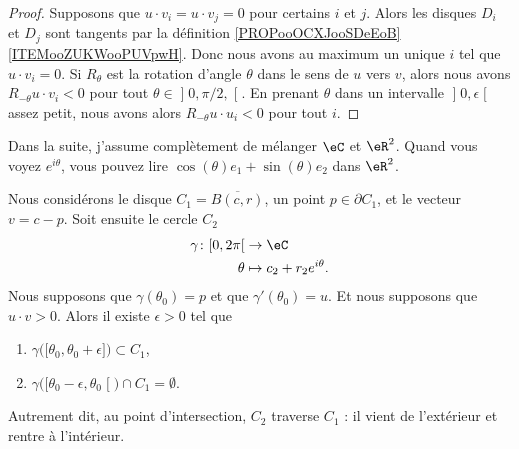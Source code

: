 \begin{proof}
	Supposons que \( u\cdot v_i=u\cdot v_j=0\) pour certains \( i\) et \( j\). Alors les disques \( D_i\) et \( D_j\) sont tangents par la définition \ref{PROPooOCXJooSDeEoB}\ref{ITEMooZUKWooPUVpwH}. Donc nous avons au maximum un unique \( i\) tel que \( u\cdot v_i=0\). Si \( R_{\theta}\) est la rotation d'angle \( \theta\) dans le sens de \( u\) vers \( v\), alors nous avons \( R_{-\theta}u\cdot v_i<0\) pour tout \( \theta\in\mathopen] 0,\pi/2,\mathclose[\). En prenant \( \theta\) dans un intervalle \( \mathopen] 0,\epsilon\mathclose[\) assez petit, nous avons alors \( R_{-\theta}u\cdot u_i<0\) pour tout \( i\).
\end{proof}


\begin{normaltext}
	Dans la suite, j'assume complètement de mélanger \( \eC\) et \( \eR^2\). Quand vous voyez \( e^{i\theta}\), vous pouvez lire \( \cos(\theta)e_1+\sin(\theta)e_2\) dans \( \eR^2\).
\end{normaltext}

\begin{proposition}	\label{PROPooDHCWooBOjxEQ}
	Nous considérons le disque \( C_1=\overline{B(c,r)}\), un point \( p\in \partial C_1\), et le vecteur \( v=c-p\). Soit ensuite le cercle \( C_2\)
	\begin{equation}
		\begin{aligned}
			\gamma\colon \mathopen[ 0,2\pi\mathclose[ & \to \eC                     \\
			\theta                                    & \mapsto c_2+r_2e^{i\theta}.
		\end{aligned}
	\end{equation}
	Nous supposons que \( \gamma(\theta_0)=p\) et que \( \gamma'(\theta_0)=u\). Et nous supposons que \( u\cdot v>0\). Alors il existe \( \epsilon>0\) tel que
	\begin{enumerate}
		\item
		      \( \gamma\big( \mathopen[ \theta_0,\theta_0+\epsilon\mathclose] \big)\subset C_1\),
		\item
		      \( \gamma\big( \mathopen[ \theta_0-\epsilon,\theta_0\mathclose[ \big)\cap C_1=\emptyset.\)
	\end{enumerate}
	Autrement dit, au point d'intersection, \( C_2\) traverse \( C_1\) : il vient de l'extérieur et rentre à l'intérieur.
\end{proposition}


